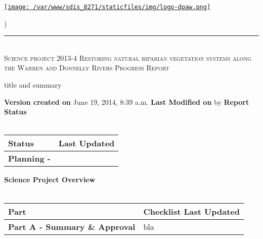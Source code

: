 \documentclass[version=last, paper=a4, DIV=18, usenames, dvipsnames]{scrartcl}
\newcommand{\HRule}{\rule{\linewidth}{0.1pt}}
\begin{document}
\setcounter{secnumdepth}{-1}


\begin{titlepage}
\begin{center}
\begin{minipage}[t]{0.28\textwidth}
\begin{flushleft}
\href{http://www.dpaw.wa.gov.au}{\texttt{[image: /var/www/sdis\_8271/staticfiles/img/logo-dpaw.png]}}
\end{flushleft}
\end{minipage}
\begin{minipage}[b]{0.7\textwidth}
\begin{flushright}
    \href{http://sdis.dpaw.wa.gov.au/documents/progressreport/1143/download/}{}) \\
\end{flushright}
\end{minipage}
\HRule \\[0.4cm]
\vfill
\textsc{\Huge Science project 2013-4 Restoring natural riparian vegetation systems along the Warren and Donnelly Rivers \newline }
\vfill
\textsc{\Huge Progress Report}

\vfill\vfill\vfill\vfill
title and summary

\vfill\vfill\vfill\vfill\vfill\vfill\vfill\vfill

\textbf{Version created on} June 19, 2014, 8:39 a.m.
\vfill
\textbf{Last Modified on}  by 
\vfill\vfill
\textbf{Report Status}\\\,
\begin{tabu} to \linewidth { | X[l] | X | }
\hline
{}
Status & Last Updated \\
\hline
\textbf{Planning - } \\
\hline
\end{tabu}
\vfill
\textbf{Science Project Overview}\\\,
\begin{tabu} to \linewidth { | X[l] | X | }
\hline
{}
Part & Checklist Last Updated \\
\hline
\textbf{Part A - Summary \& Approval} & bla \\
\hline
\end{tabu}

\end{center}
\end{titlepage}

\setcounter{tocdepth}{2}
\tableofcontents
\clearpage
\end{document}
